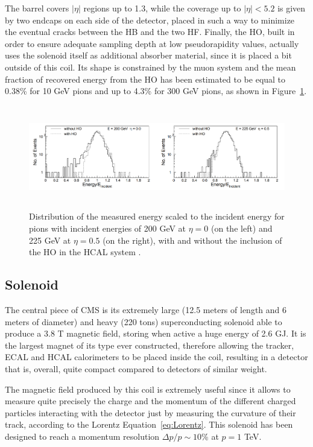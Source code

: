 \documentclass[a4paper, 10pt, openright]{report}
\begin{document}
The barrel covers $|\eta|$ regions up to 1.3, while the coverage up to $|\eta| < 5.2$ is given by two endcaps on each side of the detector, placed in such a way to minimize the eventual cracks between the HB and the two HF. Finally, the \ac{HO}, built in order to ensure adequate sampling depth at low pseudorapidity values, actually uses the solenoid itself as additional absorber material, since it is placed a bit outside of this coil. Its shape is constrained by the muon system and the mean fraction of recovered energy from the \ac{HO} has been estimated to be equal to 0.38\% for 10 GeV pions and up to 4.3\% for 300 GeV pions, as shown in Figure~\ref{fig:HOImpact}.

\begin{figure}[htbp]
\begin{center}
\includegraphics[width=15cm, height=4.5cm]{figs/HOImpact.png}
\caption{Distribution of the measured energy scaled to the incident energy for pions with incident energies of 200 GeV at $\eta = 0$ (on the left) and 225 GeV at $\eta = 0.5$ (on the right), with and without the inclusion of the \ac{HO} in the \ac{HCAL} system \cite{CMSDescription}.}
\label{fig:HOImpact}
\end{center}
\end{figure}

\subsection{Solenoid} \label{subsection:Solenoid}

The central piece of \ac{CMS} is its extremely large (12.5 meters of length and 6 meters of diameter) and heavy (220 tons) superconducting solenoid able to produce a 3.8 T magnetic field, storing when active a huge energy of 2.6 GJ. It is the largest magnet of its type ever constructed, therefore allowing the tracker, \ac{ECAL} and \ac{HCAL} calorimeters to be placed inside the coil, resulting in a detector that is, overall, quite compact compared to detectors of similar weight.

The magnetic field produced by this coil is extremely useful since it allows to measure quite precisely the charge and the momentum of the different charged particles interacting with the detector just by measuring the curvature of their track, according to the Lorentz Equation~\ref{eq:Lorentz}. This solenoid has been designed to reach a momentum resolution $\Delta p/p \sim 10$\% at $p = 1$ TeV. 
\end{document}

